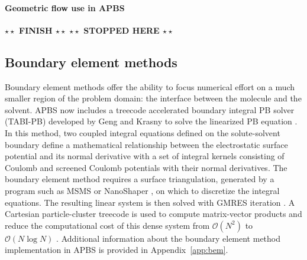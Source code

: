 \documentclass[11pt,titlepage]{article}
\newcommand{\todo}[1]{\textbf{$\star \star$ {#1} $\star \star$}}
\begin{document}
\paragraph{Geometric flow use in APBS}
\todo{FINISH}
\todo{STOPPED HERE}

\subsection{Boundary element methods} \label{sec:bem}
Boundary element methods offer the ability to focus numerical effort on a much smaller region of the problem domain:  the interface between the molecule and the solvent.
APBS now includes a treecode accelerated boundary integral PB solver (TABI-PB) developed by Geng and Krasny to solve the linearized PB equation \cite{Geng2013}.
In this method, two coupled integral equations defined on the solute-solvent boundary define a mathematical relationship between the electrostatic surface potential and its normal derivative with a set of integral kernels consisting of Coulomb and screened Coulomb potentials with their normal derivatives.
The boundary element method requires a surface triangulation, generated by a program such as MSMS \cite{Sanner1995} or NanoShaper \cite{Decherchi2013}, on which to discretize the integral equations.
The resulting linear system is then solved with GMRES iteration \cite{Saad1986}.
A Cartesian particle-cluster treecode is used to compute matrix-vector products and reduce the computational cost of this dense system from $\mathcal{O}(N^2)$ to $\mathcal{O}(N\log N)$ \cite{Li2009, Juffer1991}.
Additional information about the boundary element method implementation in APBS is provided in Appendix~\ref{app:bem}.
\end{document}
